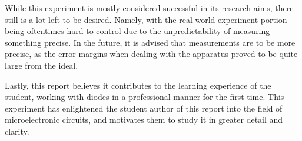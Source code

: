 \documentclass[11pt]{report}
\begin{document}
While this experiment is mostly considered successful in its research aims, there still is a lot left to be desired. Namely, with the real-world experiment portion being oftentimes hard to control due to the unpredictability of measuring something precise. In the future, it is advised that measurements are to be more precise, as the error margins when dealing with the apparatus proved to be quite large from the ideal.

Lastly, this report believes it contributes to the learning experience of the student, working with diodes in a professional manner for the first time. This experiment has enlightened the student author of this report into the field of microelectronic circuits, and motivates them to study it in greater detail and clarity.

\printbibliography
\end{document}
